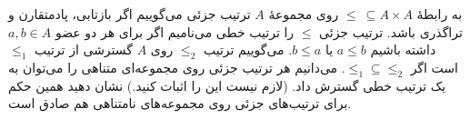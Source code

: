 به رابطهٔ
$\leq\ \subseteq A\times A$
روی مجموعهٔ
$A$
ترتیب جزئی می‌گوییم اگر بازتابی، پادمتقارن و تراگذری باشد. ترتیب جزئی
$\leq$
را ترتیب خطی می‌نامیم اگر برای هر دو عضو
$a,b\in A$
داشته باشیم
$a\leq b$
یا
$b\leq a$.
می‌گوییم ترتیب
$\leq_2$
روی
$A$
گسترشی از ترتیب
$\leq_1$
است اگر
$\leq_1\subseteq \leq_2$.
می‌دانیم هر ترتیب جزئی روی مجموعه‌ای متناهی را می‌توان به یک ترتیب خطی گسترش داد. (لازم نیست این را اثبات کنید.)
نشان دهید همین حکم برای ترتیب‌های جزئی روی مجموعه‌های نامتناهی هم صادق است.